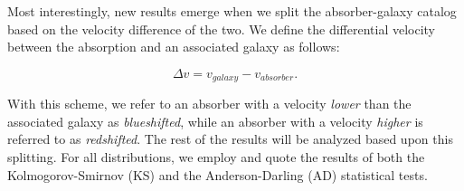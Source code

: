 \documentclass[iop]{emulateapj-rtx4}
\begin{document}
Most interestingly, new results emerge when we split the absorber-galaxy catalog based on the velocity difference of the two. We define the differential velocity between the absorption and an associated galaxy as follows:

\begin{equation}
	\Delta v = v_{galaxy} - v_{absorber}.
\end{equation}

With this scheme, we refer to an absorber with a velocity \textit{lower} than the associated galaxy as \textit{blueshifted}, while an absorber with a velocity \textit{higher} is referred to as \textit{redshifted}. The rest of the results will be analyzed based upon this splitting. For all distributions, we employ and quote the results of both the Kolmogorov-Smirnov (KS) and the Anderson-Darling (AD) statistical tests.
\end{document}
